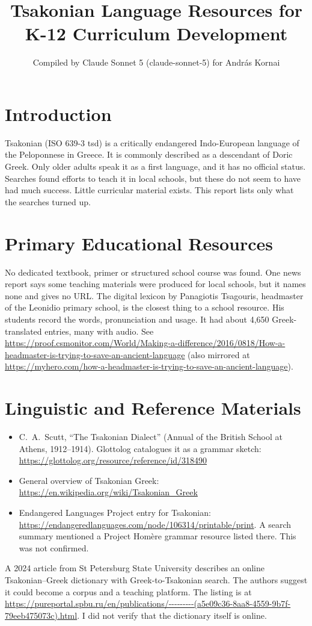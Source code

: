 \documentclass[12pt]{article}
\title{Tsakonian Language Resources for K-12 Curriculum Development}
\author{Compiled by Claude Sonnet 5 (claude-sonnet-5) for Andr\'as Kornai}
\date{}
\begin{document}
\maketitle

\section{Introduction}
Tsakonian (ISO 639-3 tsd) is a critically endangered Indo-European language of the Peloponnese in Greece. It is commonly described as a descendant of Doric Greek. Only older adults speak it as a first language, and it has no official status. Searches found efforts to teach it in local schools, but these do not seem to have had much success. Little curricular material exists. This report lists only what the searches turned up.

\section{Primary Educational Resources}
No dedicated textbook, primer or structured school course was found. One news report says some teaching materials were produced for local schools, but it names none and gives no URL. The digital lexicon by Panagiotis Tsagouris, headmaster of the Leonidio primary school, is the closest thing to a school resource. His students record the words, pronunciation and usage. It had about 4,650 Greek-translated entries, many with audio. See \url{https://proof.csmonitor.com/World/Making-a-difference/2016/0818/How-a-headmaster-is-trying-to-save-an-ancient-language} (also mirrored at \url{https://myhero.com/how-a-headmaster-is-trying-to-save-an-ancient-language}).

\section{Linguistic and Reference Materials}
\begin{itemize}
\item C.\ A.\ Scutt, ``The Tsakonian Dialect'' (Annual of the British School at Athens, 1912--1914). Glottolog catalogues it as a grammar sketch: \url{https://glottolog.org/resource/reference/id/318490}
\item General overview of Tsakonian Greek: \url{https://en.wikipedia.org/wiki/Tsakonian_Greek}
\item Endangered Languages Project entry for Tsakonian: \url{https://endangeredlanguages.com/node/106314/printable/print}. A search summary mentioned a Project Hom\`ere grammar resource listed there. This was not confirmed.
\end{itemize}
A 2024 article from St Petersburg State University describes an online Tsakonian--Greek dictionary with Greek-to-Tsakonian search. The authors suggest it could become a corpus and a teaching platform. The listing is at \url{https://pureportal.spbu.ru/en/publications/---------(a5e09c36-8aa8-4559-9b7f-79eeb475073c).html}. I did not verify that the dictionary itself is online.
\end{document}
